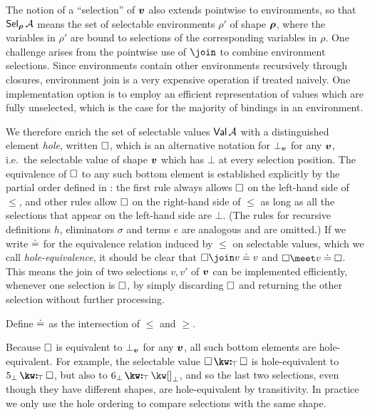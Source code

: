 The notion of a ``selection'' of $\bm{v}$ also extends pointwise to environments, so that $\textup{\textsf{Sel}}_{\bm{\rho}}\,{\mathcal{A}}$ means the set of selectable environments $\rho'$ of shape $\bm{\rho}$, where the variables in $\rho'$ are bound to selections of the corresponding variables in $\rho$. One challenge arises from the pointwise use of $\join$ to combine environment selections. Since environments contain other environments recursively through closures, environment join is a very expensive operation if treated naively. One implementation option is to employ an efficient representation of values which are fully unselected, which is the case for the majority of bindings in an environment.

We therefore enrich the set of selectable values $\textup{\textsf{Val}}\,{\mathcal{A}}$ with a distinguished element \emph{hole}, written $\square$, which is an alternative notation for $\bot_{\bm{v}}$ for any $\bm{v}$, i.e.~the selectable value of shape $\bm{v}$ which has $\bot$ at every selection position. The equivalence of $\square$ to any such bottom element is established explicitly by the partial order defined in : the first rule always allows $\square$ on the left-hand side of $\leq$, and other rules allow $\square$ on the right-hand side of $\leq$ as long as all the selections that appear on the left-hand side are $\bot$. (The rules for recursive definitions $h$, eliminators $\sigma$ and terms $e$ are analogous and are omitted.) If we write $\doteq$ for the equivalence relation induced by $\leq$ on selectable values, which we call \emph{hole-equivalence}, it should be clear that $\hole \join v \eq v$ and $\hole \meet v \eq \hole$. This means the join of two selections $v, v'$ of $\bm{v}$ can be implemented efficiently, whenever one selection is $\square$, by simply discarding $\square$ and returning the other selection without further processing.

\begin{definition}
   Define $\doteq$ as the intersection of $\leq$ and $\geq$.
\end{definition}

Because $\square$ is equivalent to $\bot_{\bm{v}}$ for any $\bm{v}$, all such bottom elements are hole-equivalent. For example, the selectable value $\annCons{\hole}{\hole}{\top}$ is hole-equivalent to $\annCons{5_{\bot}}{\hole}{\top}$, but also to $\annCons{6_{\bot}}{{\exNil_{\bot}}}{\top}$, and so the last two selections, even though they have different shapes, are hole-equivalent by transitivity. In practice we only use the hole ordering to compare selections with the same shape.
